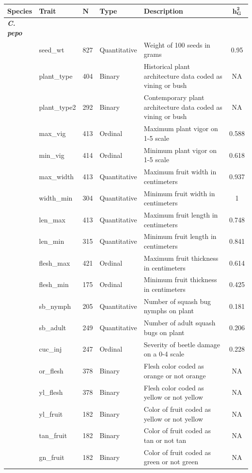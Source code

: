 \documentclass[utf8]{FrontiersinHarvard} %
\begin{document}
\clearpage

\begin{center}
\begin{longtable}{l l l l p{5cm} c}
\hline
\textbf{Species} & \textbf{Trait} & $\mathbf{N}$ &\textbf{Type} & \textbf{Description} & $\mathbf{h_{G}^{2}}$ \\
\hline
\textbf{\emph{C. pepo}} & & & & & \\
& seed\_wt & 827 &Quantitative & Weight of 100 seeds in grams& 0.95 \\
& plant\_type & 404 &Binary & Historical plant architecture data coded as vining or bush& NA \\
& plant\_type2 & 292 &Binary & Contemporary plant architecture data coded as vining or bush& NA\\
& max\_vig & 413 & Ordinal & Maximum plant vigor on 1-5 scale& 0.588 \\
& min\_vig & 414 &Ordinal & Minimum plant vigor on 1-5 scale & 0.618 \\
& max\_width & 413 &Quantitative & Maximum fruit width in centimeters & 0.937 \\
& width\_min & 304 &Quantitative & Minimum fruit width in centimeters & 1\\
& len\_max & 413 &Quantitative & Maximum fruit length in centimeters & 0.748\\
& len\_min & 315 &Quantitative & Minimum fruit length in centimeters & 0.841\\
& flesh\_max & 421 &Ordinal & Maximum fruit thickness in centimeters & 0.614\\
& flesh\_min & 175 & Ordinal & Minimum fruit thickness in centimeters & 0.425\\
& sb\_nymph & 205 & Quantitative & Number of squash bug nymphs on plant & 0.181 \\
& sb\_adult & 249 &Quantitative & Number of adult squash bugs on plant & 0.206 \\
& cuc\_inj & 247 &Ordinal & Severity of beetle damage on a 0-4 scale & 0.228\\
& or\_flesh & 378 &Binary & Flesh color coded as orange or not orange & NA \\
& yl\_flesh & 378 &Binary & Flesh color coded as yellow or not yellow & NA \\
& yl\_fruit & 182 &Binary & Color of fruit coded as yellow or not yellow & NA\\
& tan\_fruit & 182 &Binary & Color of fruit coded as tan or not tan & NA \\
& gn\_fruit & 182 &Binary & Color of fruit coded as green or not green & NA \\

\end{longtable}
\end{center}
\end{document}
